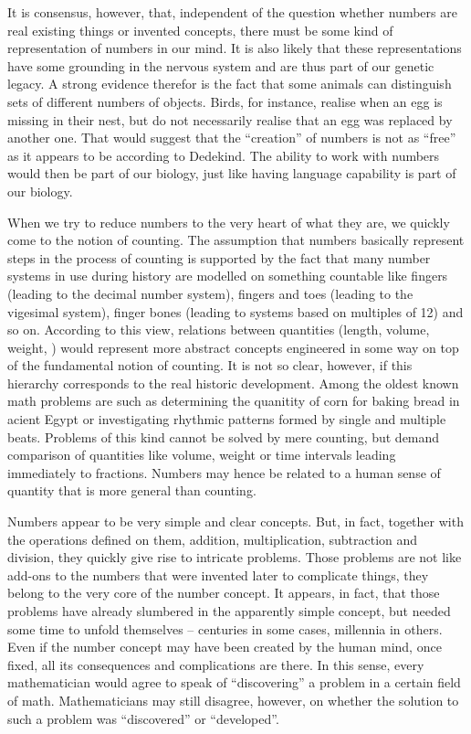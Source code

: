\documentclass{scrreprt}
\begin{document}
It is consensus, however, that, independent
of the question whether numbers are real existing things
or invented concepts,
there must be some kind of representation of numbers
in our mind.
It is also likely that these representations
have some grounding in the nervous system
and are thus part of our genetic legacy.
A strong evidence therefor is the fact
that some animals can distinguish sets
of different numbers of objects.
Birds, for instance, realise when an egg
is missing in their nest,
but do not necessarily realise
that an egg was replaced by another one.
That would suggest
that the ``creation'' of numbers 
is not as ``free'' as it appears to be
according to Dedekind.
The ability to work with numbers 
would then be part of our biology,
just like having language capability
is part of our biology.

When we try to reduce numbers to the very heart
of what they are, we quickly come to the notion
of counting. 
The assumption that numbers basically represent
steps in the process of counting
is supported by the fact
that many number systems in use during history
are modelled on something countable
like fingers (leading to the decimal number system), 
fingers and toes (leading to the vigesimal system), 
finger bones (leading to systems based on multiples of 12)
and so on.
According to this view,
relations between quantities (length, volume, weight, \etc)
would represent more abstract concepts engineered in some way
on top of the fundamental notion of counting.
It is not so clear, however, 
if this hierarchy corresponds to the real historic development.
Among the oldest known math problems
are such as determining the quanitity of corn for baking bread
in acient Egypt
or investigating rhythmic patterns formed by single and multiple beats.
Problems of this kind cannot be solved
by mere counting, but demand comparison of  quantities
like volume, weight or time intervals
leading immediately to fractions.
Numbers may hence be related to a human sense of quantity
that is more general than counting.

Numbers appear to be very simple and clear concepts.
But, in fact, together with the operations defined on them,
addition, multiplication, subtraction and division,
they quickly give rise to intricate problems.
Those problems are not like add-ons to the numbers
that were invented later to complicate things,
they belong to the very core of the number concept.
It appears, in fact, that those problems
have already slumbered in the 
apparently simple concept,
but needed some time
to unfold themselves --
centuries in some cases, millennia in others.
Even if the number concept may have been
created by the human mind,
once fixed, all its consequences and complications are there.
In this sense,
every mathematician would agree to speak of
``discovering'' a problem in a certain field of math.
Mathematicians may still disagree, however, on whether 
the solution to such a problem
was ``discovered'' or ``developed''.
\end{document}
